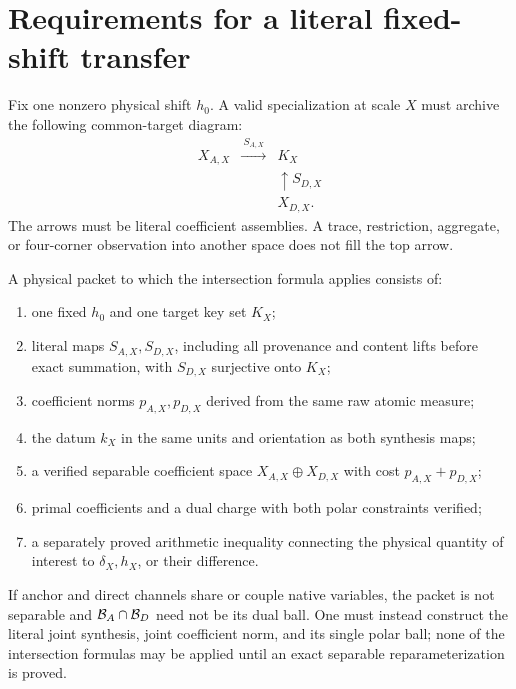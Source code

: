 \section{Requirements for a literal fixed-shift transfer}
\label{sec:physical}

Fix one nonzero physical shift \(h_0\).  A valid specialization at scale
\(X\) must archive the following common-target diagram:
\[
\begin{array}{ccc}
 X_{A,X} & \xrightarrow{\ S_{A,X}\ } & K_X\\
 && \uparrow S_{D,X}\\[-0.3em]
 && X_{D,X}.
\end{array}
\]
The arrows must be literal coefficient assemblies.  A trace,
restriction, aggregate, or four-corner observation into another space
does not fill the top arrow.

\begin{definition}\label{def:packet}
A physical packet to which the intersection formula applies consists
of:
\begin{enumerate}[label=(H\arabic*),leftmargin=2.7em]
\item one fixed \(h_0\) and one target key set \(K_X\);
\item literal maps \(S_{A,X},S_{D,X}\), including all provenance and
content lifts before exact summation, with \(S_{D,X}\) surjective onto
\(K_X\);
\item coefficient norms \(p_{A,X},p_{D,X}\) derived from the same raw
atomic measure;
\item the datum \(k_X\) in the same units and orientation as both
synthesis maps;
\item a verified separable coefficient space
\(X_{A,X}\oplus X_{D,X}\) with cost \(p_{A,X}+p_{D,X}\);
\item primal coefficients and a dual charge with both polar constraints
verified;
\item a separately proved arithmetic inequality connecting the physical
quantity of interest to \(\delta_X,h_X\), or their difference.
\end{enumerate}
\end{definition}

If anchor and direct channels share or couple native variables, the
packet is not separable and \(\mathcal B_A\cap\mathcal B_D\) need not be its dual
ball.  One must instead construct the literal joint synthesis, joint
coefficient norm, and its single polar ball; none of the intersection
formulas may be applied until an exact separable reparameterization is
proved.

